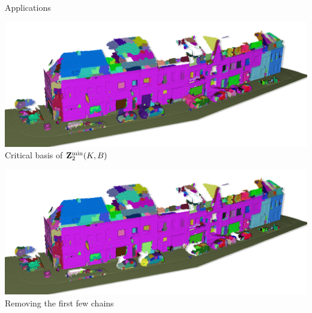 \begin{frame}{Applications}
	\pause%
	\begin{minipage}{0.5\linewidth}
		\centering
		\includegraphics[width=\linewidth]{applications/lille_meshes}\\
		Critical basis of $\mathbf{Z}^{\min}_2(K, B)$
	\end{minipage}%
	\hfill%
	\pause%
	\begin{minipage}{0.5\linewidth}
		\centering
		\includegraphics[width=\linewidth]{applications/lille_meshes_2}\\
		Removing the first few chains
	\end{minipage}
\end{frame}